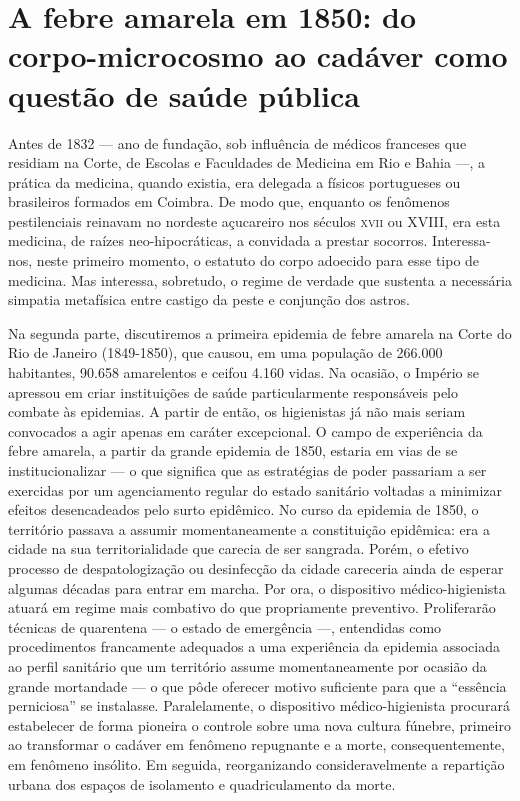 \chapter{A febre amarela em 1850: do corpo-microcosmo ao cadáver como
questão de saúde
pública}

Antes de 1832 --- ano de fundação, sob influência de médicos franceses
que residiam na Corte, de Escolas e Faculdades de Medicina em Rio e
Bahia ---, a prática da medicina, quando existia, era delegada a físicos
portugueses ou brasileiros formados em Coimbra. De modo que, enquanto os
fenômenos pestilenciais reinavam no nordeste açucareiro nos séculos \textsc{xvii}
ou XVIII, era esta medicina, de raízes neo-hipocráticas, a convidada a
prestar socorros. Interessa-nos, neste primeiro momento, o estatuto do
corpo adoecido para esse tipo de medicina. Mas interessa, sobretudo, o
regime de verdade que sustenta a necessária simpatia metafísica entre
castigo da peste e conjunção dos astros.

Na segunda parte, discutiremos a primeira epidemia de febre amarela na
Corte do Rio de Janeiro (1849-1850), que causou, em uma população de
266.000 habitantes, 90.658 amarelentos e ceifou 4.160 vidas. Na ocasião,
o Império se apressou em criar instituições de saúde particularmente
responsáveis pelo combate às epidemias. A partir de então, os
higienistas já não mais seriam convocados a agir apenas em caráter
excepcional. O campo de experiência da febre amarela, a partir da grande
epidemia de 1850, estaria em vias de se institucionalizar --- o que
significa que as estratégias de poder passariam a ser exercidas por um
agenciamento regular do estado sanitário voltadas a minimizar efeitos
desencadeados pelo surto epidêmico. No curso da epidemia de 1850, o
território passava a assumir momentaneamente a constituição epidêmica:
era a cidade na sua territorialidade que carecia de ser sangrada. Porém,
o efetivo processo de despatologização ou desinfecção da cidade
careceria ainda de esperar algumas décadas para entrar em marcha. Por
ora, o dispositivo médico-higienista atuará em regime mais combativo do
que propriamente preventivo. Proliferarão técnicas de quarentena --- o
estado de emergência ---, entendidas como procedimentos francamente
adequados a uma experiência da epidemia associada ao perfil sanitário
que um território assume momentaneamente por ocasião da grande
mortandade --- o que pôde oferecer motivo suficiente para que a
``essência perniciosa'' se instalasse. Paralelamente, o dispositivo
médico-higienista procurará estabelecer de forma pioneira o controle
sobre uma nova cultura fúnebre, primeiro ao transformar o cadáver em
fenômeno repugnante e a morte, consequentemente, em fenômeno insólito.
Em seguida, reorganizando consideravelmente a repartição urbana dos
espaços de isolamento e quadriculamento da morte.

